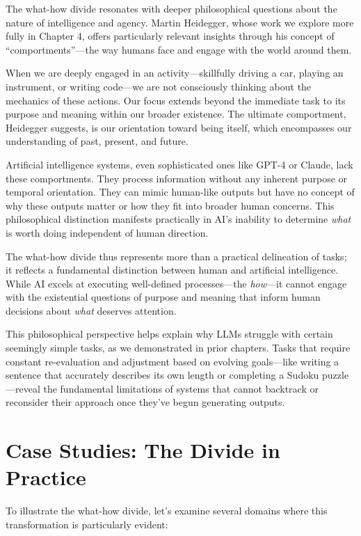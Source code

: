 \documentclass[
  Letterpaper,
]{scrbook}
\begin{document}
The what-how divide resonates with deeper philosophical questions about
the nature of intelligence and agency. Martin Heidegger, whose work we
explore more fully in Chapter 4, offers particularly relevant insights
through his concept of ``comportments''---the way humans face and engage
with the world around them.

When we are deeply engaged in an activity---skillfully driving a car,
playing an instrument, or writing code---we are not consciously thinking
about the mechanics of these actions. Our focus extends beyond the
immediate task to its purpose and meaning within our broader existence.
The ultimate comportment, Heidegger suggests, is our orientation toward
being itself, which encompasses our understanding of past, present, and
future.

Artificial intelligence systems, even sophisticated ones like GPT-4 or
Claude, lack these comportments. They process information without any
inherent purpose or temporal orientation. They can mimic human-like
outputs but have no concept of why these outputs matter or how they fit
into broader human concerns. This philosophical distinction manifests
practically in AI's inability to determine \emph{what} is worth doing
independent of human direction.

The what-how divide thus represents more than a practical delineation of
tasks; it reflects a fundamental distinction between human and
artificial intelligence. While AI excels at executing well-defined
processes---the \emph{how}---it cannot engage with the existential
questions of purpose and meaning that inform human decisions about
\emph{what} deserves attention.

This philosophical perspective helps explain why LLMs struggle with
certain seemingly simple tasks, as we demonstrated in prior chapters.
Tasks that require constant re-evaluation and adjustment based on
evolving goals---like writing a sentence that accurately describes its
own length or completing a Sudoku puzzle---reveal the fundamental
limitations of systems that cannot backtrack or reconsider their
approach once they've begun generating outputs.

\section{Case Studies: The Divide in
Practice}\label{case-studies-the-divide-in-practice}

To illustrate the what-how divide, let's examine several domains where
this transformation is particularly evident:
\end{document}

